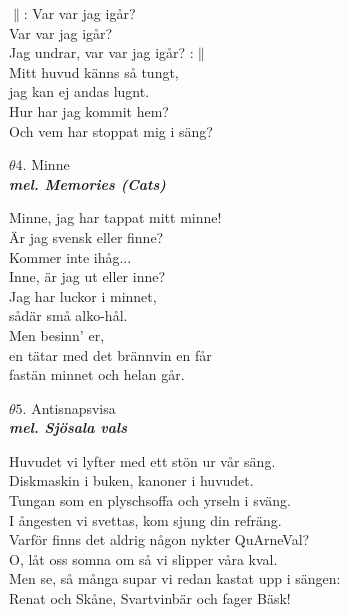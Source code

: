 \documentclass[a6paper,10pt]{article}
\newcommand{\mel}[1]{\small\textbf{\textit{mel. #1 \\}}}
\begin{document}
\setlength{\oddsidemargin}{-0.37in}
\noindent
$\|$: Var var jag igår? \\
Var var jag igår? \\
Jag undrar, var var jag igår? :$\|$\\
Mitt huvud känns så tungt, \\
jag kan ej andas lugnt. \\
Hur har jag kommit hem? \\
Och vem har stoppat mig i säng? 
\vspace{10pt}
\begin{center}
\Large $\theta4$. Minne \\ 
\mel{Memories (Cats)}
\end{center}
Minne, jag har tappat mitt minne! \\
Är jag svensk eller finne?\\
Kommer inte ihåg...
\vspace{5pt}\\
Inne, är jag ut eller inne?\\
Jag har luckor i minnet,\\
sådär små alko-hål.\\
Men besinn' er,\\
en tätar med det brännvin en får\\
fastän minnet och helan går. 
\vspace{10pt}
\begin{center}
\Large $\theta5$. Antisnapsvisa \\ 
\mel{Sjösala vals}
\end{center}
Huvudet vi lyfter med ett stön ur vår säng.\\
Diskmaskin i buken, kanoner i huvudet.\\
Tungan som en plyschsoffa och yrseln i sväng.\\
I ångesten vi svettas, kom sjung din refräng.
\vspace{5pt}\\
Varför finns det aldrig någon nykter QuArneVal?\\
O, låt oss somna om så vi slipper våra kval.\\
Men se, så många supar vi redan kastat upp i sängen:\\
Renat och Skåne, Svartvinbär och fager Bäsk! 
\end{document}
